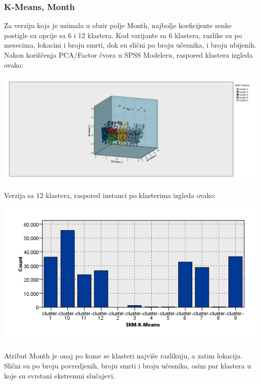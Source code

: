 \documentclass[
	12pt,			
	openright,		
	oneside,			
	a4paper,		
	english,			
	]{article}
\begin{document}
    \subsubsection{K-Means, Month}
    Za verziju koja je uzimala u obzir polje Month, najbolje koeficijente senke postigle su opcije sa 6 i 12 klastera.
    Kod varijante sa 6 klastera, razlike su po mesecima, lokacini i broju smrti, dok su slični po broju učesnika, i broju ubijenih.
    \newpage
    Nakon koriščenja PCA/Factor čvora u SPSS Modeleru, raspored klastera izgleda ovako: 
    \begin{center}
    \includegraphics[width = 15cm]{Slike/KM_Month6.png}
    \end{center}
    Verzija sa 12 klastera, raspored instanci po klasterima izgleda ovako: 
    \begin{center}
    \includegraphics[width = 15cm]{Slike/KMMonth12.png}
    \end{center}
    Atribut Month je onaj po kome se klasteri najviše razlikuju, a zatim lokacija. Slični su po broju povredjenih, broju smrti i broju učesnika, osim par klastera u koje su svrstani ekstremni slučajevi.
    \newpage
    
\end{document}
